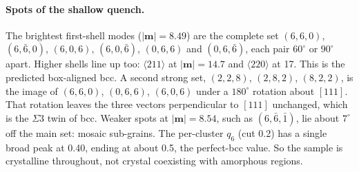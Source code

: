 \documentclass[11pt]{article}
\begin{document}
\paragraph{Spots of the shallow quench.} The brightest first-shell modes
($|\mathbf m|=8.49$) are the complete set $(6,6,0)$, $(6,\bar6,0)$, $(6,0,6)$,
$(6,0,\bar6)$, $(0,6,6)$ and $(0,6,\bar6)$, each pair $60^\circ$ or $90^\circ$
apart. Higher shells line up too: $\langle211\rangle$ at
$|\mathbf m|=14.7$ and $\langle220\rangle$ at 17. This is the predicted
box-aligned bcc. A second strong set,
$(2,2,8)$, $(2,8,2)$, $(8,2,2)$, is the image of $(6,6,0)$, $(0,6,6)$,
$(6,0,6)$ under a $180^\circ$ rotation about $[111]$. That rotation leaves
the three vectors perpendicular to $[111]$ unchanged, which is the $\Sigma3$
twin of bcc. Weaker spots at $|\mathbf m|=8.54$, such as $(6,\bar6,\bar1)$,
lie about $7^\circ$ off the main set: mosaic sub-grains. The per-cluster $q_6$
(cut 0.2) has a single broad peak at 0.40, ending at about 0.5, the perfect-bcc
value. So the sample is crystalline throughout, not crystal coexisting with
amorphous regions.
\end{document}
